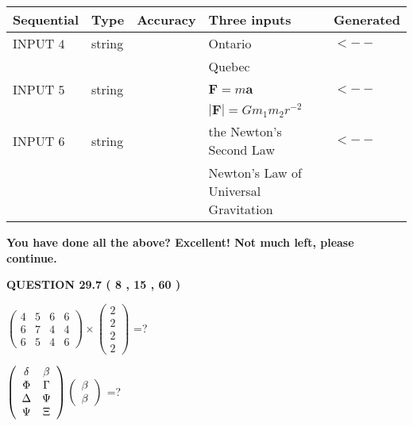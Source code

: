 \documentclass[12pt]{article}
\begin{document}
   
  
  
\noindent\begin{tabular}{|l|l|l|l|l|}
\hline
 Sequential & Type & Accuracy & Three inputs & Generated \\ 
\hline
 
 
  INPUT $            4 $ & string & & 
 Ontario & 
  $ <-- $ 
  \\
  & & & 
 Quebec & 
 \\  \hline  
 
 
  INPUT $            5 $ & string & & 
 $\mathbf{F}=m\mathbf{a}$ & 
  $ <-- $ 
  \\
  & & & 
 $\left| \mathbf{F}\right| =Gm_1m_2r^{-2}$ & 
 \\  \hline  
 
 
  INPUT $            6 $ & string & & 
 the Newton's Second Law & 
  $ <-- $ 
  \\
  & & & 
 Newton's Law of Universal Gravitation & 
 \\  \hline  
 \end{tabular}
   
   
   
   
\vspace{0.3in}
{\textbf{\LARGE{You have done all the above? Excellent! Not much left, please continue.}}}
\vspace{0.3in}
   
   
  
\vspace{0.2in}
  
{\textbf{\Large{QUESTION
29.7 
 (           8 ,          15 ,          60 )
}}}
  
  
 
$ \left( \begin{array}{ccccccccc}
           4  & 
           5  & 
           6  & 
           6  \\ 
           6  & 
           7  & 
           4  & 
           4  \\ 
           6  & 
           5  & 
           4  & 
           6
\end{array}\right) \times
\left( \begin{array}{c}
           2  \\ 
           2  \\ 
           2  \\ 
           2
\end{array}\right) $ =?
 
 
$  %
 \left( \begin{array}
 {
 c
 c
 }
 \delta & 
 \beta \\ 
 \Phi & 
 \Gamma \\ 
 \Delta & 
 \Psi \\ 
 \Psi & 
                    \Xi
 \end{array} \right)
 \left( \begin{array}
 {
 c
 }
 \beta \\ 
 \beta
 \end{array} \right)
$ =?
 
\end{document}
